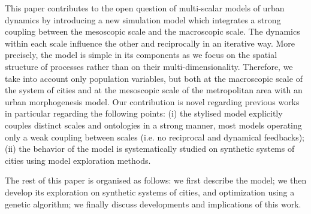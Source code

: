 \documentclass[ijgi,article,submit,moreauthors,pdftex]{Definitions/mdpi}
\begin{document}
This paper contributes to the open question of multi-scalar models of urban dynamics by introducing a new simulation model which integrates a strong coupling between the mesoscopic scale and the macroscopic scale. The dynamics within each scale influence the other and reciprocally in an iterative way. More precisely, the model is simple in its components as we focus on the spatial structure of processes rather than on their multi-dimensionality. Therefore, we take into account only population variables, but both at the macroscopic scale of the system of cities and at the mesoscopic scale of the metropolitan area with an urban morphogenesis model. Our contribution is novel regarding previous works in particular regarding the following points: (i) the stylised model explicitly couples distinct scales and ontologies in a strong manner, most models operating only a weak coupling between scales (i.e. no reciprocal and dynamical feedbacks); (ii) the behavior of the model is systematically studied on synthetic systems of cities using model exploration methods.
 
 
The rest of this paper is organised as follows: we first describe the model; we then develop its exploration on synthetic systems of cities, and optimization using a genetic algorithm; we finally discuss developments and implications of this work.


\end{document}
